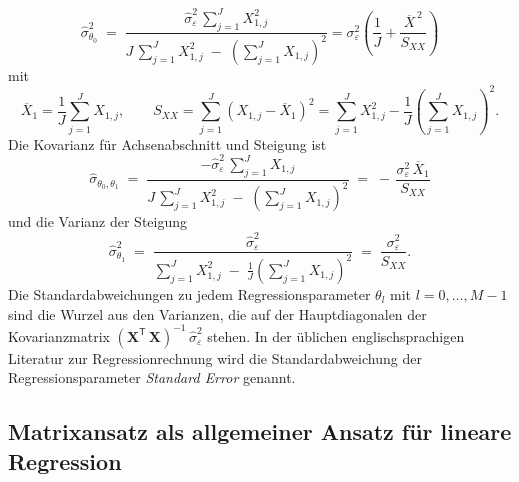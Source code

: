 \begin{equation}
\hat \sigma^2_{\theta_0} \; = \;
\frac{\hat \sigma^2_\varepsilon \, \sum\limits_{j=1}^J X_{1,j}^2}{J \,
	\sum\limits_{j=1}^J X_{1,j}^2 \; - \; \left(\sum\limits_{j=1}^J X_{1,j}\right)^2} = \sigma_\varepsilon^2
    \left(\frac{1}{J}+\frac{\overline{X}^{\,2}}{S_{XX}}\right)
\label{eq:VarianzAchsenabschnitt}
\end{equation}
mit 
$$
\overline{X}_1 = \frac{1}{J} \sum\limits_{j=1}^J X_{1,j}, \qquad
S_{XX}
= \sum_{j=1}^{J}(X_{1,j}-\overline{X}_1)^2
= \sum_{j=1}^{J}X_{1,j}^2
  - \frac{1}{J}\left(\sum_{j=1}^{J}X_{1,j}\right)^2.
$$
Die Kovarianz für Achsenabschnitt und Steigung ist
\begin{equation}
\hat \sigma_{\theta_0, \theta_1} \; = \;
\frac{- \hat \sigma^2_\varepsilon \, \sum\limits_{j=1}^J X_{1,j}}{J \, \sum_{j=1}^J X_{1,j}^2 \;
	- \; \left(\sum\limits_{j=1}^J X_{1,j}\right)^2} \; = \;
- \, \frac{\sigma^2_\varepsilon \, \overline{X}_1}{S_{XX}}
\label{eq:KovarianzAchsenabschnittSteigung}
\end{equation}
und die Varianz der Steigung
\begin{equation}
\hat \sigma^2_{\theta_1} \; = \;
\frac{\hat \sigma^2_\varepsilon}{\sum\limits_{j=1}^J X_{1,j}^2 \; - \;
	\frac{1}{J}\left(\sum\limits_{j=1}^J X_{1,j}\right)^2} 
	\; = \; \frac{\sigma^2_\varepsilon}{S_{XX}}.
\label{eq:VarianzSteigung}
\end{equation}
Die Standardabweichungen zu jedem Regressionsparameter $\theta_l$ mit $l = 0,\dots,M-1$ sind
die Wurzel aus den Varianzen, die auf der Hauptdiagonalen der Kovarianzmatrix
$\left( \mathbf{X}^\mathsf{T}  \, \mathbf{X} \right)^{-1} \, \hat \sigma_{\varepsilon}^2$
stehen. In der üblichen englischsprachigen Literatur zur Regressionrechnung wird
die Standardabweichung der Regressionsparameter \textsl{Standard Error} genannt.


\subsection{Matrixansatz als allgemeiner Ansatz für lineare Regression}


